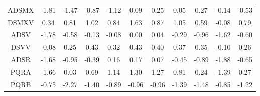\documentclass[11pt,a4paper]{report}
\begin{document}
\begin{longtable}{ | c || c | c | c | c | c | c | c | c | c || c |}
ADSMX &  \cellcolor[HTML]{FFCFCF} -1.81 &  \cellcolor[HTML]{FFD7D7} -1.47 &  \cellcolor[HTML]{FFE7E7} -0.87 &  \cellcolor[HTML]{FFDFDF} -1.12 &  \cellcolor[HTML]{FFFFFF} 0.09 &  \cellcolor[HTML]{F7F7FF} 0.25 &  \cellcolor[HTML]{FFFFFF} 0.05 &  \cellcolor[HTML]{F7F7FF} 0.27 &  \cellcolor[HTML]{FFFFFF} -0.14 &  \cellcolor[HTML]{FFEFEF} -0.53 \\
DSMXV &  \cellcolor[HTML]{F7F7FF} 0.34 &  \cellcolor[HTML]{E7E7FF} 0.81 &  \cellcolor[HTML]{E7E7FF} 1.02 &  \cellcolor[HTML]{E7E7FF} 0.84 &  \cellcolor[HTML]{D7D7FF} 1.63 &  \cellcolor[HTML]{E7E7FF} 0.87 &  \cellcolor[HTML]{E7E7FF} 1.05 &  \cellcolor[HTML]{EFEFFF} 0.59 &  \cellcolor[HTML]{FFFFFF} -0.08 &  \cellcolor[HTML]{EFEFFF} 0.79 \\
ADSV &  \cellcolor[HTML]{FFCFCF} -1.78 &  \cellcolor[HTML]{FFEFEF} -0.58 &  \cellcolor[HTML]{FFFFFF} -0.13 &  \cellcolor[HTML]{FFFFFF} -0.08 &  \cellcolor[HTML]{FFFFFF} 0.00 &  \cellcolor[HTML]{FFFFFF} 0.04 &  \cellcolor[HTML]{FFF7F7} -0.29 &  \cellcolor[HTML]{FFE7E7} -0.96 &  \cellcolor[HTML]{FFD7D7} -1.62 &  \cellcolor[HTML]{FFEFEF} -0.60 \\
DSVV &  \cellcolor[HTML]{FFFFFF} -0.08 &  \cellcolor[HTML]{F7F7FF} 0.25 &  \cellcolor[HTML]{F7F7FF} 0.43 &  \cellcolor[HTML]{F7F7FF} 0.32 &  \cellcolor[HTML]{F7F7FF} 0.43 &  \cellcolor[HTML]{F7F7FF} 0.40 &  \cellcolor[HTML]{F7F7FF} 0.37 &  \cellcolor[HTML]{F7F7FF} 0.35 &  \cellcolor[HTML]{FFFFFF} -0.10 &  \cellcolor[HTML]{F7F7FF} 0.26 \\
ADSR &  \cellcolor[HTML]{FFD7D7} -1.68 &  \cellcolor[HTML]{FFE7E7} -0.95 &  \cellcolor[HTML]{FFF7F7} -0.39 &  \cellcolor[HTML]{FFFFFF} 0.16 &  \cellcolor[HTML]{F7F7FF} 0.17 &  \cellcolor[HTML]{FFFFFF} 0.07 &  \cellcolor[HTML]{FFF7F7} -0.45 &  \cellcolor[HTML]{FFE7E7} -0.89 &  \cellcolor[HTML]{FFCFCF} -1.88 &  \cellcolor[HTML]{FFEFEF} -0.65 \\
PQRA &  \cellcolor[HTML]{FFD7D7} -1.66 &  \cellcolor[HTML]{FFFFFF} 0.03 &  \cellcolor[HTML]{EFEFFF} 0.69 &  \cellcolor[HTML]{DFDFFF} 1.14 &  \cellcolor[HTML]{DFDFFF} 1.30 &  \cellcolor[HTML]{DFDFFF} 1.27 &  \cellcolor[HTML]{E7E7FF} 0.81 &  \cellcolor[HTML]{F7F7FF} 0.24 &  \cellcolor[HTML]{FFDFDF} -1.39 &  \cellcolor[HTML]{F7F7FF} 0.27 \\
PQRB &  \cellcolor[HTML]{FFEFEF} -0.75 &  \cellcolor[HTML]{FFC7C7} -2.27 &  \cellcolor[HTML]{FFDFDF} -1.40 &  \cellcolor[HTML]{FFE7E7} -0.89 &  \cellcolor[HTML]{FFE7E7} -0.96 &  \cellcolor[HTML]{FFE7E7} -0.96 &  \cellcolor[HTML]{FFDFDF} -1.39 &  \cellcolor[HTML]{FFD7D7} -1.48 &  \cellcolor[HTML]{FFE7E7} -0.85 &  \cellcolor[HTML]{FFDFDF} -1.22 \\

\end{longtable}
\end{document}
